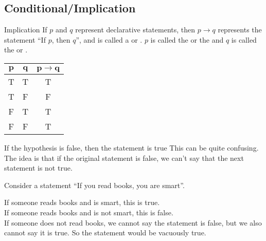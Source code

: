 \documentclass[\main/notes.tex]{subfiles}
\begin{document}
			\subsection[Conditional]{Conditional/Implication}
				\begin{definition}{Implication}
					If $p$ and $q$ represent declarative statements, then $p \rightarrow q$ represents the statement ``If $p$, then $q$'', and is called a  or . $p$ is called the  or the  and $q$ is called the  or .
				\end{definition}
				\nopagebreak
				\begin{center}
					\begin{tabular}{|c c | c|}
						\hline
						$\mathbf{p}$ & $\mathbf{q}$ & $\mathbf{p \rightarrow q}$\\
						\hline
						T & T & T\\
						T & F & F\\
						F & T & T\\
						F & F & T\\
						\hline
					\end{tabular}	
				\end{center}
				\nopagebreak
				\begin{sidenote}{If the hypothesis is false, then the statement is true}
					This can be quite confusing. The idea is that if the original statement is false, we can't say that the next statement is not true.
					\begin{example}
						Consider a statement ``If you read books, you are smart''.
						\begin{indentparagraph}
							If someone reads books and is smart, this is true.\\
							If someone reads books and is not smart, this is false.\\
							If someone does not read books, we cannot say the statement is false, but we also cannot say it is true. So the statement would be vacuously true.
						\end{indentparagraph}
					\end{example} 
				\end{sidenote}
\end{document}

